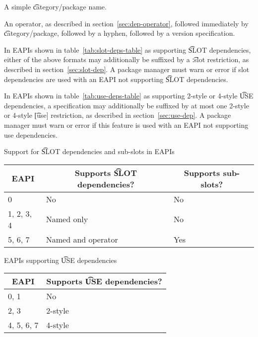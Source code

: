 \begin{compactitem}
\item A simple \t{category/package} name.
\item An operator, as described in section~\ref{sec:dep-operator}, followed immediately by
    \t{category/package}, followed by a hyphen, followed by a version specification.
\end{compactitem}

In EAPIs shown in table~\ref{tab:slot-deps-table} as supporting \t{SLOT} dependencies, either of the
above formats may additionally be suffixed by a \t{:slot} restriction, as described in
section~\ref{sec:slot-dep}. A package manager must warn or error if slot dependencies are used with an
EAPI not supporting \t{SLOT} dependencies.

 In EAPIs shown in table~\ref{tab:use-deps-table} as supporting 2-style
or 4-style \t{USE} dependencies, a specification may additionally be suffixed by at most one
2-style or 4-style \t{[use]} restriction, as described in section~\ref{sec:use-dep}. A package
manager must warn or error if this feature is used with an EAPI not supporting use dependencies.


\begin{centertable}{Support for \t{SLOT} dependencies and sub-slots in EAPIs}
    \label{tab:slot-deps-table}
    \begin{tabular}{lll}
      \toprule
      \multicolumn{1}{c}{\textbf{EAPI}} &
      \multicolumn{1}{c}{\textbf{Supports \t{SLOT} dependencies?}} &
      \multicolumn{1}{c}{\textbf{Supports sub-slots?}} \\
      \midrule
      0                 & No                 & No  \\
      1, 2, 3, 4        & Named only         & No  \\
      5, 6, 7           & Named and operator & Yes \\
      \bottomrule
    \end{tabular}
\end{centertable}

\begin{centertable}{EAPIs supporting \t{USE} dependencies}
    \label{tab:use-deps-table}
    \begin{tabular}{ll}
      \toprule
      \multicolumn{1}{c}{\textbf{EAPI}} &
      \multicolumn{1}{c}{\textbf{Supports \t{USE} dependencies?}} \\
      \midrule
      0, 1              & No      \\
      2, 3              & 2-style \\
      4, 5, 6, 7        & 4-style \\
      \bottomrule
    \end{tabular}
\end{centertable}

